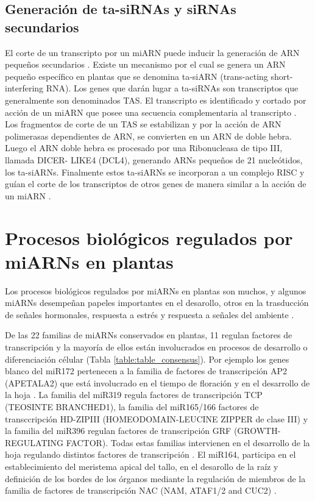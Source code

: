 \subsection{Generación de ta-siRNAs y siRNAs secundarios}
El corte de un transcripto por un miARN puede inducir la generación de ARN pequeños secundarios \citep{Allen2005207, pmid19066226,pmid19066226,pmid20643946,pmid20562854,pmid22308502}.
Existe un mecanismo por el cual se genera un ARN pequeño específico en plantas que se denomina ta-siARN (trans-acting short-interfering RNA).
Los genes que darán lugar a ta-siRNAs son transcriptos que generalmente son denominados TAS.
El transcripto es identificado y cortado por acción de un miARN que posee una secuencia complementaria al transcripto \citep{Allen2005207}.
Los fragmentos de corte de un TAS se estabilizan y por la acción de ARN polimerasas dependientes de ARN, se convierten en un ARN de doble hebra.
Luego el ARN doble hebra es procesado por una Ribonucleasa de tipo III, llamada DICER- LIKE4 (DCL4), generando ARNs pequeños de 21 nucleótidos, los ta-siARNs.
Finalmente estos ta-siARNs se incorporan a un complejo RISC y guían el corte de los transcriptos de otros genes de manera similar a la acción de un miARN \citep{Allen2005207,pmid16040244,pmid16131612,Xie2005a}.

\section{Procesos biológicos regulados por miARNs en plantas}
Los procesos biológicos regulados por miARNs en plantas son muchos, y algunos miARNs desempeñan papeles importantes en el desarollo, otros en la trasducción de señales hormonales, respuesta a estrés y respuesta a señales del ambiente \citep{Voinnet2009669, pmid21466971, pmid19699140}.

De las 22 familias de miARNs conservados en plantas, 11 regulan factores de transcripción y la mayoría de ellos están involucrados en procesos de desarrollo o diferenciación célular \citep{Jones-Rhoades2006} (Tabla \ref{table:table_consensus}).
Por ejemplo los genes blanco del miR172 pertenecen a la familia de factores de transcripción AP2 (APETALA2) que está involucrado en el tiempo de floración y en el desarrollo de la hoja \citep{pmid14555699, pmid12893888}.
La familia del miR319 regula factores de transcripción TCP (TEOSINTE BRANCHED1), la familia del miR165/166 factores de transccripción HD-ZIPIII (HOMEODOMAIN-LEUCINE ZIPPER de clase III) y la familia del miR396 regulan factores de transcripción GRF (GROWTH-REGULATING FACTOR).
Todas estas familias intervienen en el desarrollo de la hoja regulando distintos factores de transcripción \citep{pmid12931144, pmid15351964, Rodriguez2010}.
El miR164, participa en el establecimiento del meristema apical del tallo, en el desarollo de la raíz y definición de los bordes de los órganos mediante la regulación de miembros de la familia de factores de transcripción NAC (NAM, ATAF1/2 and CUC2) \citep{laufus}.

